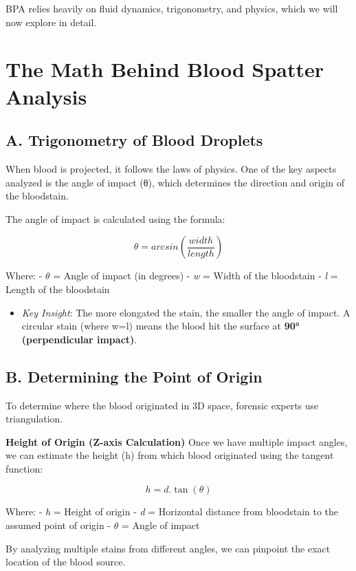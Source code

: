 \documentclass[11pt]{article}
\providecommand{\tightlist}{%
      \setlength{\itemsep}{0pt}\setlength{\parskip}{0pt}}
\begin{document}
BPA relies heavily on fluid dynamics, trigonometry, and physics, which
we will now explore in detail.

\section{The Math Behind Blood Spatter
Analysis}\label{the-math-behind-blood-spatter-analysis}

\subsection{A. Trigonometry of Blood
Droplets}\label{a.-trigonometry-of-blood-droplets}

When blood is projected, it follows the laws of physics. One of the key
aspects analyzed is the angle of impact (θ), which determines the
direction and origin of the bloodstain.

The angle of impact is calculated using the formula:

\[\theta = arcsin\left(\frac{width}{length}\right)\]

Where: - \emph{\(\theta\)} = Angle of impact (in degrees) - \emph{w} =
Width of the bloodstain - \emph{l} = Length of the bloodstain

\begin{itemize}
\tightlist
\item
  \emph{Key Insight}: The more elongated the stain, the smaller the
  angle of impact. A circular stain (where w=l) means the blood hit the
  surface at \textbf{90° (perpendicular impact)}.
\end{itemize}

\subsection{B. Determining the Point of
Origin}\label{b.-determining-the-point-of-origin}

To determine where the blood originated in 3D space, forensic experts
use triangulation.

\textbf{Height of Origin (Z-axis Calculation)} Once we have multiple
impact angles, we can estimate the height (h) from which blood
originated using the tangent function:

\[h=d.\tan(\theta)\]

Where: - \emph{h} = Height of origin - \emph{d} = Horizontal distance
from bloodstain to the assumed point of origin - \emph{\(\theta\)} =
Angle of impact

By analyzing multiple stains from different angles, we can pinpoint the
exact location of the blood source.
\end{document}
